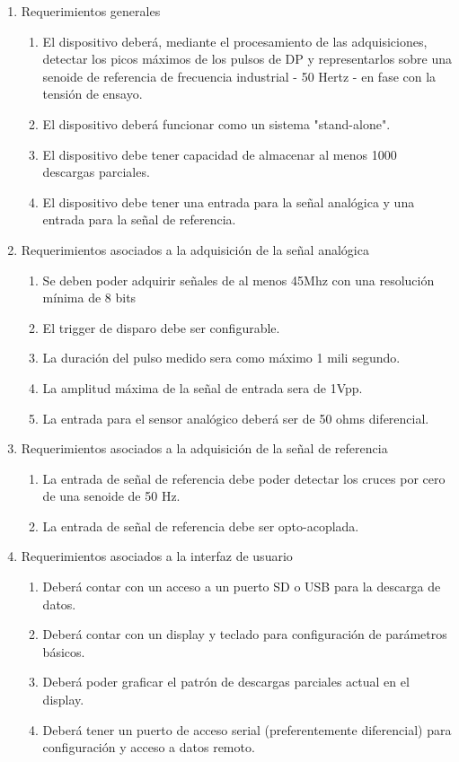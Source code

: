 \documentclass[11pt]{charter}
\begin{document}
\begin{enumerate}
\item Requerimientos generales
	\begin{enumerate}
	\item El dispositivo deberá, mediante el procesamiento de las adquisiciones, detectar los picos máximos de los pulsos de DP y representarlos sobre una senoide de referencia de frecuencia industrial - 50 Hertz - en fase con la tensión de ensayo.
	\item El dispositivo deberá funcionar como un sistema "stand-alone".
	\item El dispositivo debe tener capacidad de almacenar al menos 1000 descargas parciales.
	\item El dispositivo debe tener una entrada para la señal analógica y una entrada para la señal de referencia.	
	\end{enumerate}
\item Requerimientos asociados a la adquisición de la señal analógica
	\begin{enumerate}
	\item Se deben poder adquirir señales de al menos 45Mhz con una resolución mínima de 8 bits
	\item El trigger de disparo debe ser configurable.
	\item La duración del pulso medido sera como máximo 1 mili segundo.
	\item La amplitud máxima de la señal de entrada sera de 1Vpp.
	\item La entrada para el sensor analógico deberá ser de 50 ohms diferencial.
	\end{enumerate}
\item Requerimientos asociados a la adquisición de la señal de referencia
	\begin{enumerate}
	\item La entrada de señal de referencia debe poder detectar los cruces por cero de una senoide de 50 Hz.
	\item La entrada de señal de referencia debe ser opto-acoplada.
	\end{enumerate}
\item Requerimientos asociados a la interfaz de usuario
	\begin{enumerate}
	\item Deberá contar con un acceso a un puerto SD o USB para la descarga de datos. 
	\item Deberá contar con un display y teclado para configuración de parámetros básicos.
	\item Deberá poder graficar el patrón de descargas parciales actual en el display.
	\item Deberá tener un puerto de acceso serial (preferentemente diferencial) para configuración y acceso a datos remoto.
	
	\end{enumerate}
\end{enumerate}
\end{document}
